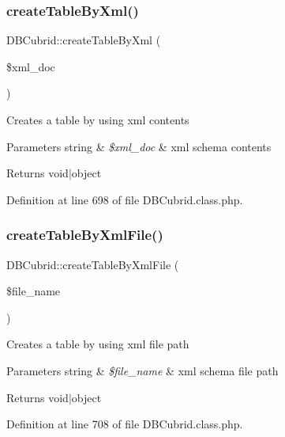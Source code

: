 \subsubsection{\texorpdfstring{create\+Table\+By\+Xml()}{createTableByXml()}}
{\footnotesize\ttfamily D\+B\+Cubrid\+::create\+Table\+By\+Xml (\begin{DoxyParamCaption}\item[{}]{\$xml\+\_\+doc }\end{DoxyParamCaption})}

Creates a table by using xml contents 
\begin{DoxyParams}[1]{Parameters}
string & {\em \$xml\+\_\+doc} & xml schema contents \\
\hline
\end{DoxyParams}
\begin{DoxyReturn}{Returns}
void$\vert$object 
\end{DoxyReturn}


Definition at line 698 of file D\+B\+Cubrid.\+class.\+php.

\mbox{\label{classDBCubrid_ac94184ec9952bbfee913f3295806fbfe}} 
\subsubsection{\texorpdfstring{create\+Table\+By\+Xml\+File()}{createTableByXmlFile()}}
{\footnotesize\ttfamily D\+B\+Cubrid\+::create\+Table\+By\+Xml\+File (\begin{DoxyParamCaption}\item[{}]{\$file\+\_\+name }\end{DoxyParamCaption})}

Creates a table by using xml file path 
\begin{DoxyParams}[1]{Parameters}
string & {\em \$file\+\_\+name} & xml schema file path \\
\hline
\end{DoxyParams}
\begin{DoxyReturn}{Returns}
void$\vert$object 
\end{DoxyReturn}


Definition at line 708 of file D\+B\+Cubrid.\+class.\+php.

\mbox{\label{classDBCubrid_aa3bdbcc2f3c50b224f6e243ca0ed1d69}} 
